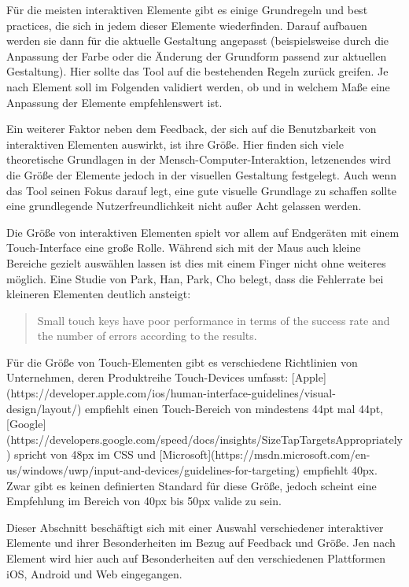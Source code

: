 Für die meisten interaktiven Elemente gibt es einige Grundregeln und best practices, die sich in jedem dieser Elemente wiederfinden. Darauf aufbauen werden sie dann für die aktuelle Gestaltung angepasst (beispielsweise durch die Anpassung der Farbe oder die Änderung der Grundform passend zur aktuellen Gestaltung).
Hier sollte das Tool auf die bestehenden Regeln zurück greifen. Je nach Element soll im Folgenden validiert werden, ob und in welchem Maße eine Anpassung der Elemente empfehlenswert ist.

Ein weiterer Faktor neben dem Feedback, der sich auf die Benutzbarkeit von interaktiven Elementen auswirkt, ist ihre Größe. Hier finden sich viele theoretische Grundlagen in der Mensch-Computer-Interaktion, letzenendes wird die Größe der Elemente jedoch in der visuellen Gestaltung festgelegt. Auch wenn das Tool seinen Fokus darauf legt, eine gute visuelle Grundlage zu schaffen sollte eine grundlegende Nutzerfreundlichkeit nicht außer Acht gelassen werden.

Die Größe von interaktiven Elementen spielt vor allem auf Endgeräten mit einem Touch-Interface eine große Rolle. Während sich mit der Maus auch kleine Bereiche gezielt auswählen lassen ist dies mit einem Finger nicht ohne weiteres möglich.
Eine Studie von Park, Han, Park, Cho belegt, dass die Fehlerrate bei kleineren Elementen deutlich ansteigt:

\begin{quote}
Small touch keys have poor performance in terms of the success rate and the number of errors according to the results.
\end{quote}

Für die Größe von Touch-Elementen gibt es verschiedene Richtlinien von Unternehmen, deren Produktreihe Touch-Devices umfasst:
[Apple](https://developer.apple.com/ios/human-interface-guidelines/visual-design/layout/) empfiehlt einen Touch-Bereich von mindestens 44pt mal 44pt, [Google](https://developers.google.com/speed/docs/insights/SizeTapTargetsAppropriately) spricht von 48px im CSS und [Microsoft](https://msdn.microsoft.com/en-us/windows/uwp/input-and-devices/guidelines-for-targeting) empfiehlt 40px.  Zwar gibt es keinen definierten Standard für diese Größe, jedoch scheint eine Empfehlung im Bereich von 40px bis 50px valide zu sein.

Dieser Abschnitt beschäftigt sich mit einer Auswahl verschiedener interaktiver Elemente und ihrer Besonderheiten im Bezug auf Feedback und Größe.
Jen nach Element wird hier auch auf Besonderheiten auf den verschiedenen Plattformen iOS, Android und Web eingegangen.

